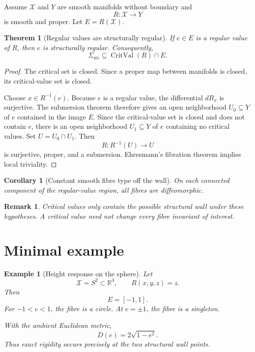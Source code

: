 \documentclass[11pt]{article}
\newtheorem{theorem}[definition]{Theorem}
\newtheorem{corollary}[definition]{Corollary}
\newtheorem{example}[definition]{Example}
\newtheorem{remark}[definition]{Remark}
\newcommand{\X}{\mathcal X}
\begin{document}
Assume \(\X\) and \(Y\) are smooth manifolds without boundary and
\[
R:\X\to Y
\]
is smooth and proper. Let \(E=R(\X)\).

\begin{theorem}[Regular values are structurally regular]
If \(e\in E\) is a regular value of \(R\), then \(e\) is structurally regular.
Consequently,
\[
\Sigma_{\mathrm{str}}
\subseteq
\operatorname{CritVal}(R)\cap E.
\]
\end{theorem}

\begin{proof}
The critical set is closed. Since a proper map between manifolds is closed,
its critical-value set is closed.

Choose \(x\in R^{-1}(e)\). Because \(e\) is a regular value, the
differential \(dR_x\) is surjective. The submersion theorem therefore gives
an open neighborhood \(U_0\subseteq Y\) of \(e\) contained in the image
\(E\). Since the critical-value set is closed and does not contain \(e\),
there is an open neighborhood \(U_1\subseteq Y\) of \(e\) containing no
critical values. Set \(U=U_0\cap U_1\). Then
\[
R:R^{-1}(U)\to U
\]
is surjective, proper, and a submersion. Ehresmann's fibration theorem implies
local triviality.
\end{proof}

\begin{corollary}[Constant smooth fibre type off the wall]
On each connected component of the regular-value region, all fibres are
diffeomorphic.
\end{corollary}

\begin{remark}
Critical values only contain the possible structural wall under these
hypotheses. A critical value need not change every fibre invariant of interest.
\end{remark}

\section{Minimal example}

\begin{example}[Height response on the sphere]
Let
\[
\X=S^2\subset\mathbb R^3,
\qquad
R(x,y,z)=z.
\]
Then
\[
E=[-1,1].
\]
For \(-1<e<1\), the fibre is a circle. At \(e=\pm1\), the fibre is a
singleton.

With the ambient Euclidean metric,
\[
D(e)=2\sqrt{1-e^2}.
\]
Thus exact rigidity occurs precisely at the two structural wall points.
\end{example}
\end{document}
